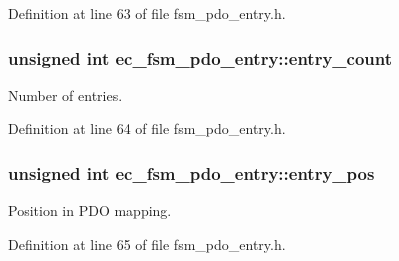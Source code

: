 \-Definition at line 63 of file fsm\-\_\-pdo\-\_\-entry.\-h.

\subsubsection[{entry\-\_\-count}]{\setlength{\rightskip}{0pt plus 5cm}unsigned int {\bf ec\-\_\-fsm\-\_\-pdo\-\_\-entry\-::entry\-\_\-count}}\label{structec__fsm__pdo__entry_aa35c32c568b656a84a7931ac415ee15d}


\-Number of entries. 



\-Definition at line 64 of file fsm\-\_\-pdo\-\_\-entry.\-h.

\subsubsection[{entry\-\_\-pos}]{\setlength{\rightskip}{0pt plus 5cm}unsigned int {\bf ec\-\_\-fsm\-\_\-pdo\-\_\-entry\-::entry\-\_\-pos}}\label{structec__fsm__pdo__entry_a9766f580ea3c1ee6fffa28979e9a4087}


\-Position in \-P\-D\-O mapping. 



\-Definition at line 65 of file fsm\-\_\-pdo\-\_\-entry.\-h.

